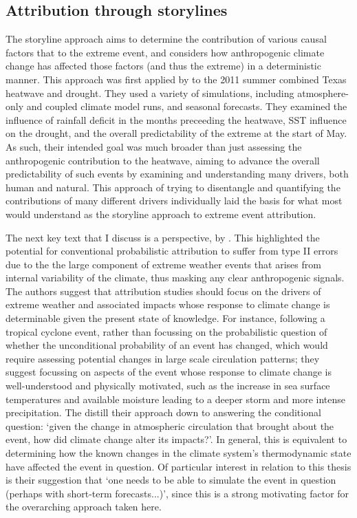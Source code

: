   \subsection{Attribution through storylines}

    The storyline approach \citep[or `Boulder' approach,][]{otto_attribution_2017} aims to determine the contribution of various causal factors that to the extreme event, and considers how anthropogenic climate change has affected those factors (and thus the extreme) in a deterministic manner. This approach was first applied by \citet{hoerling_anatomy_2013} to the 2011 summer combined Texas heatwave and drought. They used a variety of simulations, including atmosphere-only and coupled climate model runs, and seasonal forecasts. They examined the influence of rainfall deficit in the months preceeding the heatwave, SST influence on the drought, and the overall predictability of the extreme at the start of May. As such, their intended goal was much broader than just assessing the anthropogenic contribution to the heatwave, aiming to advance the overall predictability of such events by examining and understanding many drivers, both human and natural. This approach of trying to disentangle and quantifying the contributions of many different drivers individually laid the basis for what most would understand as the storyline approach to extreme event attribution.

    The next key text that I discuss is a perspective,  by \citet{trenberth_attribution_2015}. This highlighted the potential for conventional probabilistic attribution to suffer from type II errors due to the the large component of extreme weather events that arises from internal variability of the climate, thus masking any clear anthropogenic signals. The authors suggest that attribution studies should focus on the drivers of extreme weather and associated impacts whose response to climate change is determinable given the present state of knowledge. For instance, following a tropical cyclone event, rather than focussing on the probabilistic question of whether the unconditional probability of an event has changed, which would require assessing potential changes in large scale circulation patterns; they suggest focussing on aspects of the event whose response to climate change is well-understood and physically motivated, such as the increase in sea surface temperatures and available moisture leading to a deeper storm and more intense precipitation. The distill their approach down to answering the conditional question: `given the change in atmospheric circulation that brought about the event, how did climate change alter its impacts?'. In general, this is equivalent to determining how the known changes in the climate system's thermodynamic state have affected the event in question. Of particular interest in relation to this thesis is their suggestion that `one needs to be able to simulate the event in question (perhaps with short-term forecasts...)', since this is a strong motivating factor for the overarching approach taken here.

